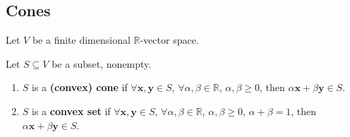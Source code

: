 \documentclass[a4paper,12pt]{amsart}
\newcommand{\RR}{\mathbb{R}}
\newcommand{\bfx}{\mathbf{x}}
\newcommand{\bfy}{\mathbf{y}}
\begin{document}
\subsection{Cones}
Let $V$ be a finite dimensional $\RR$-vector space.
\begin{Def}
Let $S\subseteq V$ be a subset, nonempty.
\begin{enumerate}
\item $S$ is a \textbf{(convex) cone} if $\forall \bfx,\bfy\in S$, $\forall \alpha,\beta\in\RR$, $\alpha,\beta\geq 0$, then $\alpha \bfx+\beta \bfy\in S$.
\item $S$ is a \textbf{convex set} if $\forall \bfx,\bfy\in S$, $\forall \alpha,\beta\in\RR$, $\alpha,\beta\geq 0$, $\alpha+\beta=1$, then $\alpha \bfx+\beta \bfy\in S$.
\end{enumerate}
\end{Def}
\end{document}
